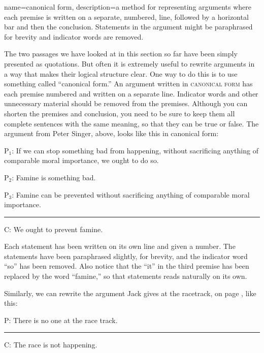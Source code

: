 {
name=canonical form,
description={a method for representing arguments where each premise is written on a separate, numbered, line, followed by a horizontal bar and then the conclusion. Statements in the argument might be paraphrased for brevity and indicator words are removed.}
}


The two passages we have looked at in this section so far have been simply presented as quotations. But often it is extremely useful to rewrite arguments in a way that makes their logical structure clear. One way to do this is to use something called ``canonical form.''   An argument written in \textsc{\gls{canonical form}} \label{def:canonical_form}has each premise numbered and written on a separate line. Indicator words and other unnecessary material should be removed from the premises. Although you can shorten the premises and conclusion, you need to be sure to keep them all complete sentences with the same meaning, so that they can be true or false. The argument from Peter Singer, above, looks like this in canonical form:

\begin{earg}
\item[P$_1$:] If we can stop something bad from happening, without sacrificing anything of comparable moral importance, we ought to do so. 
\item[P$_2$:] Famine is something bad.
\item[P$_3$:] Famine can be prevented without sacrificing anything of comparable moral importance.
\vspace{-.5em}
\item [] \rule{0.9\linewidth}{.5pt} 
\item[C:] We ought to prevent famine.
\end{earg} 

Each statement has been written on its own line and given a number. The statements have been paraphrased slightly, for brevity, and the indicator word ``so'' has been removed. Also notice that the ``it'' in the third premise has been replaced by the word ``famine,'' so that statements reads naturally on its own.  

Similarly, we can rewrite the argument Jack gives at the racetrack, on page \pageref{racetrack}, like this:

\begin{earg}
\item[P:] There is no one at the race track.
\vspace{-.5em}
\item [] \rule{0.4\linewidth}{.5pt} 
\item[C:] The race is not happening. 
\end{earg} 

